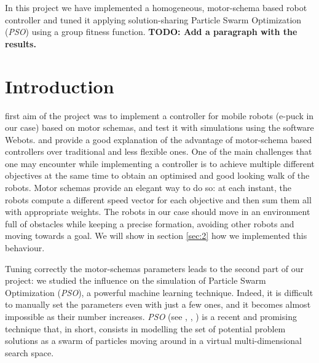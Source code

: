 \documentclass[journal]{IEEEtran}
\begin{document}
In this project we have implemented a homogeneous, motor-schema based robot controller and tuned it applying solution-sharing Particle Swarm Optimization (\textit{PSO}) using a group fitness function. 
\textbf{TODO: Add a paragraph with the results.}


\section{Introduction}
\label {sec:1}
% 
% 
% 
% 
 first aim of the project was to implement a controller
for mobile robots (e-puck in our case) based on motor schemas, and test it with simulations
using the software
Webots\textregistered. \cite{IEEEhowto:arkin_motor_schemas} and 
\cite{IEEEhowto:balch_behaviour_based} provide a
good explanation of the advantage of motor-schema based
controllers over traditional and less flexible ones. One of the main challenges that one may encounter while implementing a controller
is to achieve multiple different objectives at the same time
to obtain an optimised and good looking walk of the robots. 
Motor schemas provide an elegant way to do so: at each instant, the
robots compute a different speed vector for each objective and then
sum them all with appropriate weights. 
The robots in our case should move in an environment full of obstacles while
keeping a precise formation, avoiding other robots and moving towards
a goal. We will show in section \ref{sec:2} how we implemented this behaviour.

Tuning correctly the motor-schemas parameters leads to the second part of our project:
we studied the influence on the simulation of Particle Swarm Optimization (\textit{PSO}), a
powerful machine learning technique. Indeed, it is difficult to manually set the parameters even with just a few ones, and it becomes almost impossible as their
number increases. \textit{PSO} (see \cite{IEEEhowto:martinoli_pso},
\cite{IEEEhowto:martinoli_pso_noise}, \cite{IEEEhowto:martinoli_pso_noise_2}) is a recent and promising technique that, in short, consists in modelling the set of potential problem solutions as a swarm of particles moving around in a virtual multi-dimensional
search space.
\end{document}
